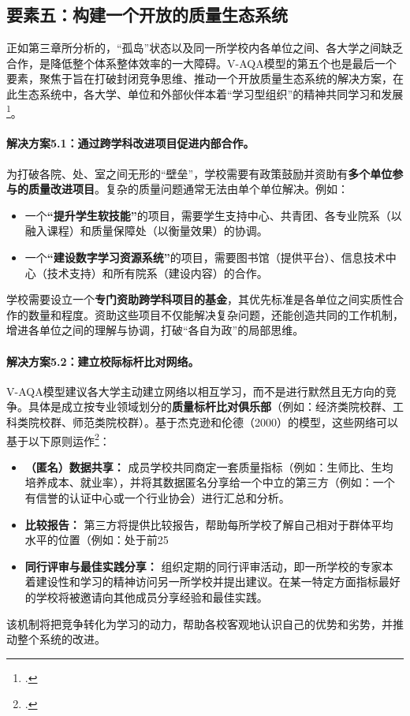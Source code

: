 
\subsection{要素五：构建一个开放的质量生态系统}
\label{subsec:giaiphap_hoptac}

正如第三章所分析的，“孤岛”状态以及同一所学校内各单位之间、各大学之间缺乏合作，是降低整个体系整体效率的一大障碍。V-AQA模型的第五个也是最后一个要素，聚焦于旨在打破封闭竞争思维、推动一个开放质量生态系统的解决方案，在此生态系统中，各大学、单位和外部伙伴本着“学习型组织”的精神共同学习和发展\footcite{Senge2006}。

\paragraph{解决方案5.1：通过跨学科改进项目促进内部合作。}
为打破各院、处、室之间无形的“壁垒”，学校需要有政策鼓励并资助有\textbf{多个单位参与的质量改进项目}。复杂的质量问题通常无法由单个单位解决。例如：
\begin{itemize}
    \item 一个\textbf{“提升学生软技能”}的项目，需要学生支持中心、共青团、各专业院系（以融入课程）和质量保障处（以衡量效果）的协调。
    \item 一个\textbf{“建设数字学习资源系统”}的项目，需要图书馆（提供平台）、信息技术中心（技术支持）和所有院系（建设内容）的合作。
\end{itemize}
学校需要设立一个\textbf{专门资助跨学科项目的基金}，其优先标准是各单位之间实质性合作的数量和程度。资助这些项目不仅能解决复杂问题，还能创造共同的工作机制，增进各单位之间的理解与协调，打破“各自为政”的局部思维。

\paragraph{解决方案5.2：建立校际标杆比对网络。}
V-AQA模型建议各大学主动建立网络以相互学习，而不是进行默然且无方向的竞争。具体是成立按专业领域划分的\textbf{质量标杆比对俱乐部}（例如：经济类院校群、工科类院校群、师范类院校群）。基于杰克逊和伦德（2000）的模型，这些网络可以基于以下原则运作\footcite{jackson_lund_2000}：
\begin{itemize}
    \item \textbf{（匿名）数据共享：} 成员学校共同商定一套质量指标（例如：生师比、生均培养成本、就业率），并将其数据匿名分享给一个中立的第三方（例如：一个有信誉的认证中心或一个行业协会）进行汇总和分析。
    \item \textbf{比较报告：} 第三方将提供比较报告，帮助每所学校了解自己相对于群体平均水平的位置（例如：处于前25%
    \item \textbf{同行评审与最佳实践分享：} 组织定期的同行评审活动，即一所学校的专家本着建设性和学习的精神访问另一所学校并提出建议。在某一特定方面指标最好的学校将被邀请向其他成员分享经验和最佳实践。
\end{itemize}
该机制将把竞争转化为学习的动力，帮助各校客观地认识自己的优势和劣势，并推动整个系统的改进。

